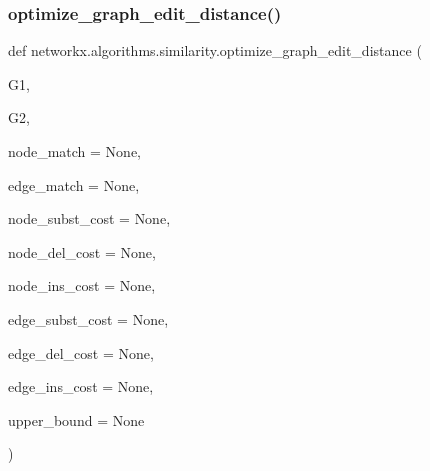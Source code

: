  \mbox{\label{namespacenetworkx_1_1algorithms_1_1similarity_a094b2ec3e7fd9c7e6b285ff592c1384c}} 
\subsubsection{\texorpdfstring{optimize\+\_\+graph\+\_\+edit\+\_\+distance()}{optimize\_graph\_edit\_distance()}}
{\footnotesize\ttfamily def networkx.\+algorithms.\+similarity.\+optimize\+\_\+graph\+\_\+edit\+\_\+distance (\begin{DoxyParamCaption}\item[{}]{G1,  }\item[{}]{G2,  }\item[{}]{node\+\_\+match = {\ttfamily None},  }\item[{}]{edge\+\_\+match = {\ttfamily None},  }\item[{}]{node\+\_\+subst\+\_\+cost = {\ttfamily None},  }\item[{}]{node\+\_\+del\+\_\+cost = {\ttfamily None},  }\item[{}]{node\+\_\+ins\+\_\+cost = {\ttfamily None},  }\item[{}]{edge\+\_\+subst\+\_\+cost = {\ttfamily None},  }\item[{}]{edge\+\_\+del\+\_\+cost = {\ttfamily None},  }\item[{}]{edge\+\_\+ins\+\_\+cost = {\ttfamily None},  }\item[{}]{upper\+\_\+bound = {\ttfamily None} }\end{DoxyParamCaption})}

